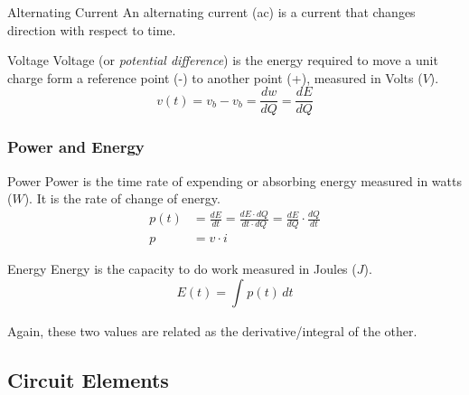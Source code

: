 \documentclass[12pt]{article}
\begin{document}
\begin{definition}{Alternating Current}
  An alternating current (ac) is a current that changes direction with respect to time.
\end{definition}

\begin{definition}{Voltage}
  Voltage (or \textit{potential difference}) is the energy required to move a unit charge form a reference point (-) to another point (+), measured in Volts ($V$).
  \begin{equation*}
    v(t) = v_b - v_b = \frac{dw}{dQ} = \frac{dE}{dQ}
  \end{equation*}
\end{definition}

%   

\subsubsection{Power and Energy}
\label{sssec:powerAndEnergy}

\begin{definition}{Power}
  Power is the time rate of expending or absorbing energy measured in watts ($W$). It is the rate of change of energy.
  \begin{align*}
    p(t) &= \frac{dE}{dt} = \frac{dE \cdot dQ}{dt \cdot dQ} = \frac{dE}{dQ} \cdot \frac{dQ}{dt} \\
    p    &= v \cdot i
  \end{align*}
\end{definition}

\begin{definition}{Energy}
  Energy is the capacity to do work measured in Joules ($J$).
  \begin{equation*}
    E(t) = \int_{}^{} p(t) \, dt
  \end{equation*}
\end{definition}

Again, these two values are related as the derivative/integral of the other.

\subsection{Circuit Elements}
\label{ssec:circuitElements}
\end{document}
